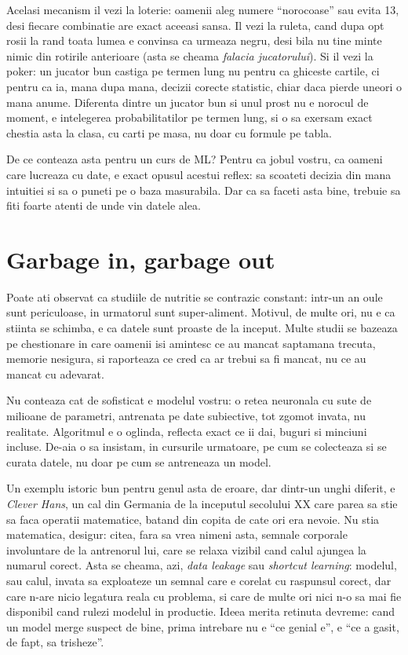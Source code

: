 Acelasi mecanism il vezi la loterie: oamenii aleg numere ``norocoase'' sau
evita 13, desi fiecare combinatie are exact aceeasi sansa. Il vezi la
ruleta, cand dupa opt rosii la rand toata lumea e convinsa ca urmeaza
negru, desi bila nu tine minte nimic din rotirile anterioare (asta se
cheama \textit{falacia jucatorului}). Si il vezi la poker: un jucator bun
castiga pe termen lung nu pentru ca ghiceste cartile, ci pentru ca ia,
mana dupa mana, decizii corecte statistic, chiar daca pierde uneori o
mana anume. Diferenta dintre un jucator bun si unul prost nu e norocul de
moment, e intelegerea probabilitatilor pe termen lung, si o sa exersam
exact chestia asta la clasa, cu carti pe masa, nu doar cu formule pe
tabla.

De ce conteaza asta pentru un curs de ML? Pentru ca jobul vostru, ca
oameni care lucreaza cu date, e exact opusul acestui reflex: sa scoateti
decizia din mana intuitiei si sa o puneti pe o baza masurabila. Dar ca sa
faceti asta bine, trebuie sa fiti foarte atenti de unde vin datele alea.

\section*{Garbage in, garbage out}

Poate ati observat ca studiile de nutritie se contrazic constant: intr-un
an oule sunt periculoase, in urmatorul sunt super-aliment. Motivul, de
multe ori, nu e ca stiinta se schimba, e ca datele sunt proaste de la
inceput. Multe studii se bazeaza pe chestionare in care oamenii isi
amintesc ce au mancat saptamana trecuta, memorie nesigura, si raporteaza
ce cred ca ar trebui sa fi mancat, nu ce au mancat cu adevarat.

Nu conteaza cat de sofisticat e modelul vostru: o retea neuronala cu sute
de milioane de parametri, antrenata pe date subiective, tot zgomot invata,
nu realitate. Algoritmul e o oglinda, reflecta exact ce ii dai, buguri si
minciuni incluse. De-aia o sa insistam, in cursurile urmatoare, pe cum se
colecteaza si se curata datele, nu doar pe cum se antreneaza un model.

Un exemplu istoric bun pentru genul asta de eroare, dar dintr-un unghi
diferit, e \textit{Clever Hans}, un cal din Germania de la inceputul
secolului XX care parea sa stie sa faca operatii matematice, batand din
copita de cate ori era nevoie. Nu stia matematica, desigur: citea, fara sa
vrea nimeni asta, semnale corporale involuntare de la antrenorul lui, care
se relaxa vizibil cand calul ajungea la numarul corect. Asta se cheama,
azi, \textit{data leakage} sau \textit{shortcut learning}: modelul, sau calul, invata sa exploateze un
semnal care e corelat cu raspunsul corect, dar care n-are nicio legatura
reala cu problema, si care de multe ori nici n-o sa mai fie disponibil
cand rulezi modelul in productie. Ideea merita retinuta devreme: cand un
model merge suspect de bine, prima intrebare nu e ``ce genial e'', e ``ce
a gasit, de fapt, sa trisheze''.

